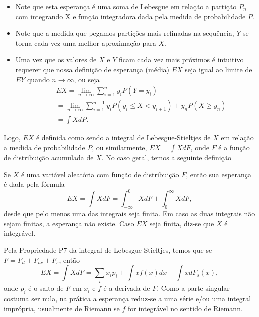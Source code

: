 \begin{frame}
\begin{block}{}
\begin{itemize}
\item Note que esta esperança é uma soma de Lebesgue em relação a partição $P_n$ com integrando X e função integradora dada pela medida de probabilidade $P$. 

\item Note que a medida que pegamos partições mais refinadas na sequência, $Y$ se torna cada vez uma melhor aproximação para $X$. 

\item Uma vez que os valores de $X$ e $Y$ ficam cada vez mais próximos  é intuitivo requerer que nossa definição de esperança (média) $EX$ seja igual ao limite de $EY$ quando $n\rightarrow\infty$, ou seja
\begin{eqnarray}
& & EX=\lim_{n\rightarrow \infty}\sum_{i=1}^{n} y_{i}P(Y=y_{i}) \nonumber\\
& & =\lim_{n\rightarrow \infty} \sum_{i=1}^{n-1} y_{i}P(y_{i}\leq X<y_{i+1})+y_nP(X\geq y_n)
\nonumber\\
& & =\int XdP.\nonumber
\end{eqnarray}
\end{itemize}
\end{block}
\end{frame}
%
\begin{frame}
%
Logo, $EX$ é definida como sendo a integral de Lebesgue-Stieltjes de $X$ em relação a medida de probabilidade $P$, ou similarmente, $EX=\int XdF$, onde $F$ é a função de distribuição acumulada de $X$. No caso geral, temos a seguinte definição
\begin{defi}
Se $X$ é uma variável aleatória com função de distribuição $F$, então sua esperança é dada pela fórmula
$$EX=\int XdF=\int_{-\infty}^0 X dF + \int_0^{\infty}XdF,$$
desde que pelo menos uma das integrais seja finita. Em caso as duas
integrais não sejam finitas, a esperança não existe. Caso $EX$ seja finita, diz-se que $X$ é integrável.
\end{defi}
%
%
%
%
Pela Propriedade P7 da integral de Lebesgue-Stieltjes, temos que se $F=F_d+F_{ac}+F_s$, então
$$EX=\int XdF=\sum_ix_ip_i + \int xf(x)dx + \int xdF_s(x),$$
onde $p_i$ é o salto de $F$ em $x_i$ e $f$ é a derivada de $F$. Como a parte singular costuma ser nula, na prática a esperança reduz-se a uma série e/ou uma integral imprópria, usualmente de Riemann se $f$ for integrável no sentido de Riemann.

\end{frame}
